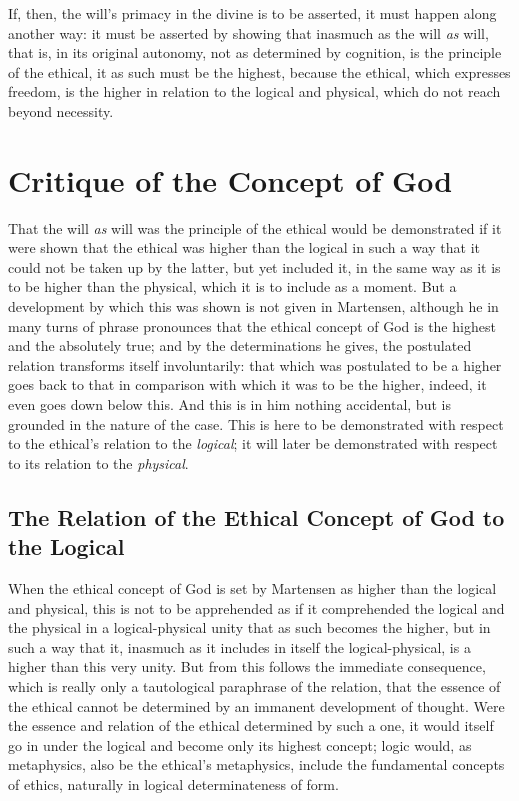 \documentclass[12pt,a4paper]{book}
\begin{document}
If, then, the will's primacy in the divine is to be asserted, it must happen along
another way: it must be asserted by showing that inasmuch as the will \emph{as}
will, that is, in its original autonomy, not as determined by cognition, is the
principle of the ethical, it as such must be the highest, because the ethical,
which expresses freedom, is the higher in relation to the logical and physical,
which do not reach beyond necessity.

\section{Critique of the Concept of God}
\label{sec:god-concept}

That the will \emph{as} will was the principle of the ethical would be demonstrated if it
were shown that the ethical was higher than the logical in such a way that it could
not be taken up by the latter, but yet included it, in the same way as it is to be
higher than the physical, which it is to include as a moment. But a development by
which this was shown is not given in Martensen, although he in many turns of phrase
pronounces that the ethical concept of God is the highest and the absolutely true;
and by the determinations he gives, the postulated relation transforms itself
involuntarily: that which was postulated to be a higher goes back to that in
comparison with which it was to be the higher, indeed, it even goes down below this.
And this is in him nothing accidental, but is grounded in the nature of the case.
This is here to be demonstrated with respect to the ethical's relation to the
\emph{logical}; it will later be demonstrated with respect to its relation to the \emph{physical}.

\subsection{The Relation of the Ethical Concept of God to the Logical}
\label{ssec:ethical-logical}

When the ethical concept of God is set by Martensen as higher than the logical and
physical, this is not to be apprehended as if it comprehended the logical and the
physical in a logical-physical unity that as such becomes the higher, but in such a
way that it, inasmuch as it includes in itself the logical-physical, is a higher
than this very unity. But from this follows the immediate consequence, which is
really only a tautological paraphrase of the relation, that the essence of the
ethical cannot be determined by an immanent development of thought. Were the essence
and relation of the ethical determined by such a one, it would itself go in under
the logical and become only its highest concept; logic would, as metaphysics, also
be the ethical's metaphysics, include the fundamental concepts of ethics, naturally
in logical determinateness of form.
\end{document}
